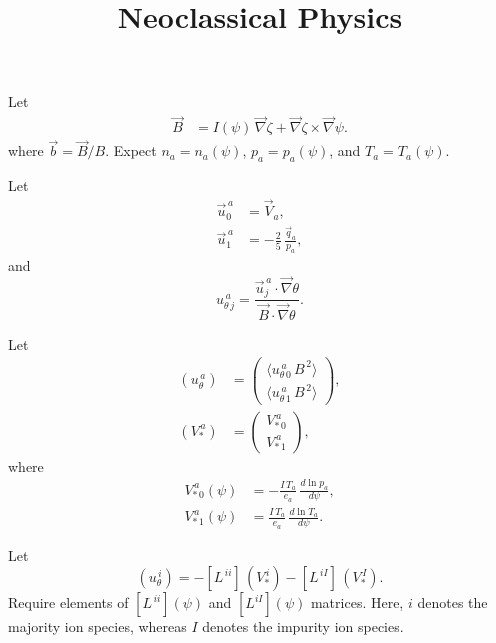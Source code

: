 \documentclass[12pt]{article}
\title{\bf Neoclassical Physics}
\date{}
\author{}
\begin{document}
\maketitle

Let
\begin{align}
\vec{B} &= I(\psi)\,\vec{\nabla} \zeta + \vec{\nabla}\zeta\times \vec{\nabla}\psi.
\end{align}
where $\vec{b}=\vec{B}/B$.
Expect $n_a=n_a(\psi)$, $p_a=p_a(\psi)$, and $T_a= T_a(\psi)$.

Let
\begin{align}
\vec{u}_0^{\,a} &= \vec{V}_a,\\[0.5ex]
\vec{u}_1^{\,a} &= - \frac{2}{5}\,\frac{\vec{q}_a}{p_a},
\end{align}
and
\begin{equation}
u_{\theta\,j}^{\,a} = \frac{\vec{u}_j^{\,a}\cdot\vec{\nabla}\theta}{\vec{B}\cdot\vec{\nabla}\theta}.
\end{equation}

Let
\begin{align}
(u_\theta^{\,a})&= \left(\begin{array}{c}\langle u_{\theta\,0}^{\,a}\, B^{\,2}\rangle\\[1ex]
\langle u_{\theta\,1}^{\,a}\, B^{\,2}\rangle\end{array}\right),\\[0.5ex]
(V_\ast^{\,a})&= \left(\begin{array}{c}V_{\ast\,0}^{\,a}\\[1ex]
V_{\ast\,1}^{\,a}\end{array}\right),
\end{align}
where
\begin{align}
V_{\ast\,0}^{\,a}(\psi) &=
- \frac{I\,T_a}{e_a}\,\frac{d \ln p_a}{d\psi},\\[0.5ex]
V_{\ast\,1}^{\,a}(\psi) &= \frac{I\,T_a}{e_a}\,\frac{d\ln T_a}{d\psi}.
\end{align}

Let
\begin{equation}
(u_\theta^{\,i}) = -[L^{\,ii}]\,(V_\ast^{\,i})-[L^{\,iI}]\,(V_\ast^{\,I}).
\end{equation}
Require elements of $[L^{\,ii}](\psi)$ and $[L^{iI}](\psi)$ matrices. Here, $i$ denotes the
majority ion species, whereas $I$ denotes the impurity ion species. 
\end{document}
